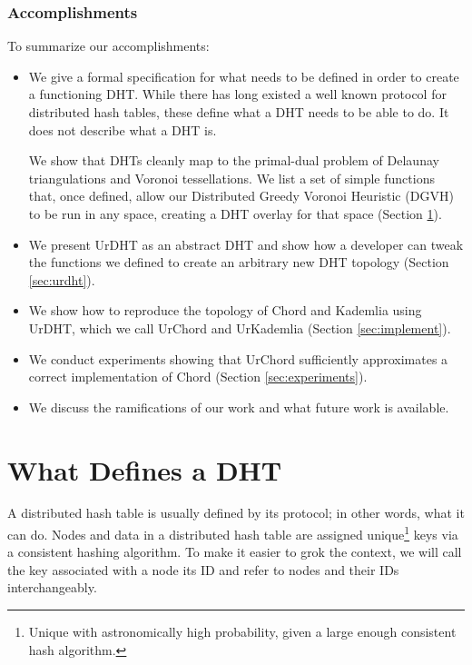 \documentclass[11pt,conference]{IEEEtran}
\begin{document}
\subsubsection*{Accomplishments}
To summarize our accomplishments:

\begin{itemize}
	\item We give a formal specification for what needs to be defined in order to create a functioning DHT.
	While there has long existed a well known protocol for distributed hash tables, these define what a DHT needs to be able to do.
	It does not describe what a DHT is.
	
	We show that DHTs cleanly map to the primal-dual problem of Delaunay triangulations and Voronoi tessellations.
	We list a set  of simple functions that, once defined, allow our Distributed Greedy Voronoi Heuristic (DGVH) to be run in any space, creating a DHT overlay for that space (Section \ref{sec:define}).
	
	
	
	\item We present UrDHT as an abstract DHT and show how a developer can tweak the functions we defined to create an arbitrary new DHT topology (Section \ref{sec:urdht}).
	\item We show how to reproduce the topology of Chord and Kademlia using UrDHT, which we call UrChord and UrKademlia (Section \ref{sec:implement}).
	
	\item We conduct experiments showing that UrChord sufficiently approximates a correct implementation of Chord (Section \ref{sec:experiments}). 
	\item We discuss the ramifications of our work and what future work is available.
\end{itemize}


\section{What Defines a DHT}
\label{sec:define}

A distributed hash table is usually defined by its protocol; in other words, what it can do.
Nodes and data in a distributed hash table are assigned unique\footnote{Unique with astronomically high probability, given a large enough consistent hash algorithm.} keys via a consistent hashing algorithm.
To make it easier to grok the context, we will call the key associated with a node its ID and refer to  nodes and their IDs interchangeably.
\end{document}
